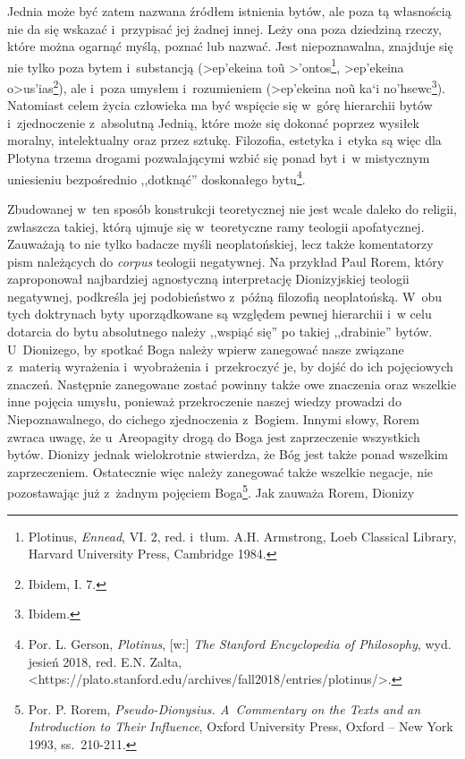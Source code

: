 Jednia może być zatem nazwana źródłem istnienia bytów, ale poza tą własnością nie da się wskazać i~przypisać jej żadnej innej. Leży ona poza dziedziną rzeczy, które można ogarnąć myślą, poznać lub nazwać. Jest niepoznawalna, znajduje się nie tylko poza bytem i~substancją (\textgreek{>ep'ekeina to\~u >'ontos}\footnote{Plotinus, \textit{Ennead}, VI. 2, red. i~tłum. A.H. Armstrong, Loeb Classical Library, Harvard University Press, Cambridge 1984.}, \textgreek{>ep'ekeina o>us'ias}\footnote{Ibidem, I. 7.}), ale i~poza umysłem i~rozumieniem (\textgreek{>ep'ekeina no\~u  ka`i no'hsewc}\footnote{Ibidem.}). Natomiast celem życia człowieka ma być wspięcie się w~górę hierarchii bytów i~zjednoczenie z~absolutną Jednią, które może się dokonać poprzez wysiłek moralny, intelektualny oraz przez sztukę. Filozofia, estetyka i~etyka są więc dla Plotyna trzema drogami pozwalającymi wzbić się ponad byt i~w mistycznym uniesieniu bezpośrednio ,,dotknąć'' doskonałego bytu\footnote{Por. L. Gerson, \textit{Plotinus}, [w:] \textit{The Stanford Encyclopedia of Philosophy}, wyd. jesień 2018, red. E.N. Zalta, {\textless}https://plato.stanford.edu/archives/fall2018/entries/plotinus/{\textgreater}.}.

Zbudowanej w~ten sposób konstrukcji teoretycznej nie jest wcale daleko do religii, zwłaszcza takiej, którą ujmuje się w~teoretyczne ramy teologii apofatycznej. Zauważają to nie tylko badacze myśli neoplatońskiej, lecz także komentatorzy pism należących do \textit{corpus} teologii negatywnej. Na przykład Paul Rorem, który zaproponował najbardziej agnostyczną interpretację Dionizyjskiej teologii negatywnej, podkreśla jej podobieństwo z~późną filozofią neoplatońską. W~obu tych doktrynach byty uporządkowane są względem pewnej hierarchii i~w celu dotarcia do bytu absolutnego należy ,,wspiąć się'' po takiej ,,drabinie'' bytów. U~Dionizego, by spotkać Boga należy wpierw zanegować nasze związane z~materią wyrażenia i~wyobrażenia i~przekroczyć je, by dojść do ich pojęciowych znaczeń. Następnie zanegowane zostać powinny także owe znaczenia oraz wszelkie inne pojęcia umysłu, ponieważ przekroczenie naszej wiedzy prowadzi do Niepoznawalnego, do cichego zjednoczenia z~Bogiem. Innymi słowy, Rorem zwraca uwagę, że u~Areopagity drogą do Boga jest zaprzeczenie wszystkich bytów. Dionizy jednak wielokrotnie stwierdza, że Bóg jest także ponad wszelkim zaprzeczeniem. Ostatecznie więc należy zanegować także wszelkie negacje, nie pozostawając już z~żadnym pojęciem Boga\footnote{Por. P. Rorem, \textit{Pseudo-Dionysius. A~Commentary on the Texts and an Introduction to Their Influence}, Oxford University Press, Oxford -- New York 1993, ss.~210-211.}. Jak zauważa Rorem, Dionizy

